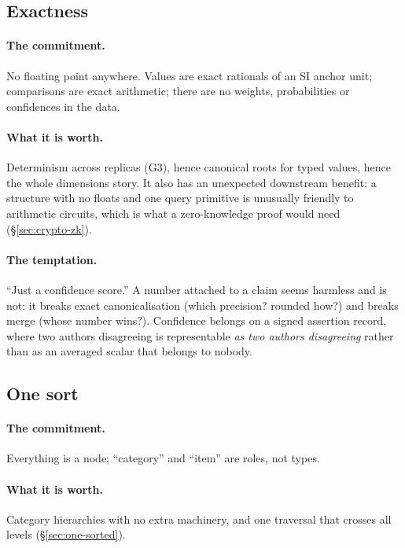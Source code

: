 \subsection{Exactness}

\paragraph{The commitment.} No floating point anywhere. Values are exact
rationals of an SI anchor unit; comparisons are exact arithmetic; there are no
weights, probabilities or confidences in the data.

\paragraph{What it is worth.} Determinism across replicas (G3), hence
canonical roots for typed values, hence the whole dimensions story. It also
has an unexpected downstream benefit: a structure with no floats and one query
primitive is unusually friendly to arithmetic circuits, which is what a
zero-knowledge proof would need (\S\ref{sec:crypto-zk}).

\paragraph{The temptation.} ``Just a confidence score.'' A number attached to
a claim seems harmless and is not: it breaks exact canonicalisation (which
precision? rounded how?) and breaks merge (whose number wins?). Confidence
belongs on a signed assertion record, where two authors disagreeing is
representable \emph{as two authors disagreeing} rather than as an averaged
scalar that belongs to nobody.

\subsection{One sort}

\paragraph{The commitment.} Everything is a node; ``category'' and ``item''
are roles, not types.

\paragraph{What it is worth.} Category hierarchies with no extra machinery,
and one traversal that crosses all levels (\S\ref{sec:one-sorted}).

